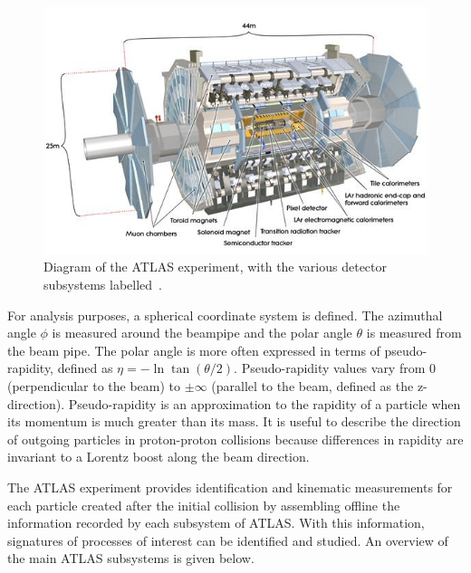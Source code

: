 \begin{figure}
    \centering
    \includegraphics[width = \textwidth]{figures/atlas_diagram.png}
    \caption{Diagram of the ATLAS experiment, with the various detector subsystems labelled~\cite{collaboration_atlas_2008}.}
    \label{fig:atlas}
\end{figure}

For analysis purposes, a spherical coordinate system is defined. The azimuthal angle $\phi$ is measured around the beampipe and the polar angle $\theta$ is measured from the beam pipe. The polar angle is more often expressed in terms of pseudo-rapidity, defined as $\eta = -\ln\tan\left(\theta/2\right)$.  Pseudo-rapidity values vary from 0 (perpendicular to the beam) to $\pm\infty$ (parallel to the beam, defined as the z-direction). Pseudo-rapidity is an approximation to the rapidity of a particle when its momentum is much greater than its mass. It is useful to describe the direction of outgoing particles in proton-proton collisions because differences in rapidity are invariant to a Lorentz boost along the beam direction.

The ATLAS experiment provides identification and kinematic measurements for each particle created after the initial collision by assembling offline the information recorded by each subsystem of ATLAS. With this information, signatures of processes of interest can be identified and studied. An overview of the main ATLAS subsystems is given below.

